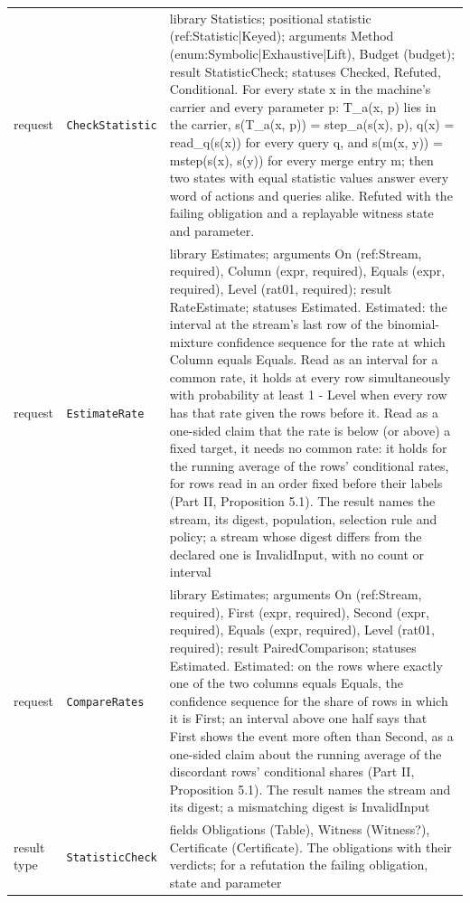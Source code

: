 \documentclass[11pt]{article}
\newcommand{\code}[1]{\texttt{#1}}
\theoremstyle{definition}
\theoremstyle{plain}
\begin{document}
\begin{footnotesize}
\begin{longtable}{>{\raggedright\arraybackslash}p{1.9cm}>{\raggedright\arraybackslash}p{3.3cm}>{\raggedright\arraybackslash}p{9.0cm}}
request & \code{CheckStatistic} & library Statistics; positional statistic (ref:\allowbreak{}Statistic|\allowbreak{}Keyed); arguments Method (enum:\allowbreak{}Symbolic|\allowbreak{}Exhaustive|\allowbreak{}Lift), Budget (budget); result StatisticCheck; statuses Checked, Refuted, Conditional. For every state x in the machine's carrier and every parameter p:\allowbreak{} T\_a(x, p) lies in the carrier, s(T\_a(x, p)) = step\_a(s(x), p), q(x) = read\_q(s(x)) for every query q, and s(m(x, y)) = mstep(s(x), s(y)) for every merge entry m; then two states with equal statistic values answer every word of actions and queries alike.  Refuted with the failing obligation and a replayable witness state and parameter.\\
request & \code{EstimateRate} & library Estimates; arguments On (ref:\allowbreak{}Stream, required), Column (expr, required), Equals (expr, required), Level (rat01, required); result RateEstimate; statuses Estimated. Estimated:\allowbreak{} the interval at the stream's last row of the binomial-mixture confidence sequence for the rate at which Column equals Equals. Read as an interval for a common rate, it holds at every row simultaneously with probability at least 1 - Level when every row has that rate given the rows before it. Read as a one-sided claim that the rate is below (or above) a fixed target, it needs no common rate:\allowbreak{} it holds for the running average of the rows' conditional rates, for rows read in an order fixed before their labels (Part II, Proposition 5.1). The result names the stream, its digest, population, selection rule and policy; a stream whose digest differs from the declared one is InvalidInput, with no count or interval\\
request & \code{CompareRates} & library Estimates; arguments On (ref:\allowbreak{}Stream, required), First (expr, required), Second (expr, required), Equals (expr, required), Level (rat01, required); result PairedComparison; statuses Estimated. Estimated:\allowbreak{} on the rows where exactly one of the two columns equals Equals, the confidence sequence for the share of rows in which it is First; an interval above one half says that First shows the event more often than Second, as a one-sided claim about the running average of the discordant rows' conditional shares (Part II, Proposition 5.1). The result names the stream and its digest; a mismatching digest is InvalidInput\\
result type & \code{StatisticCheck} & fields Obligations (Table), Witness (Witness?), Certificate (Certificate). The obligations with their verdicts; for a refutation the failing obligation, state and parameter\\

\end{longtable}
\end{footnotesize}
\end{document}
